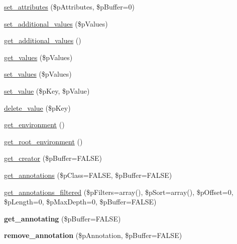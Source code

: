\begin{DoxyCompactItemize}
\item 
\hyperlink{classsteam__object_a348d67c78ca2754c3b03d640e9ea0594}{set\_\-attributes} (\$pAttributes, \$pBuffer=0)
\item 
\hyperlink{classsteam__object_a399fe34d68b8328e6380dcc891ef9aff}{set\_\-additional\_\-values} (\$pValues)
\item 
\hyperlink{classsteam__object_a5ad609e86be184a745d41318d6ae1a1e}{get\_\-additional\_\-values} ()
\item 
\hyperlink{classsteam__object_a4342f3d8ebca052a471df742eb052b20}{get\_\-values} (\$pValues)
\item 
\hyperlink{classsteam__object_a12e31dd22ff482a75f3bb423b8571b49}{set\_\-values} (\$pValues)
\item 
\hyperlink{classsteam__object_a5ebcd0c825cf2f5e7933a32fb91f49aa}{set\_\-value} (\$pKey, \$pValue)
\item 
\hyperlink{classsteam__object_a795b77fb1a75bfb564c0d95d060167c7}{delete\_\-value} (\$pKey)
\item 
\hyperlink{classsteam__object_ace4baf13ff7ad24a8aa260f9d551298b}{get\_\-environment} ()
\item 
\hyperlink{classsteam__object_a7bbd3642df6a4c789ee10e55e55d17c3}{get\_\-root\_\-environment} ()
\item 
\hyperlink{classsteam__object_ad79b59c522eb011ec389aef2e824942e}{get\_\-creator} (\$pBuffer=FALSE)
\item 
\hyperlink{classsteam__object_ab3b1b8e5f85069b51f14a81534fc7b4f}{get\_\-annotations} (\$pClass=FALSE, \$pBuffer=FALSE)
\item 
\hyperlink{classsteam__object_a9bbc1f5d4d5d69059da67d33d62c7b1a}{get\_\-annotations\_\-filtered} (\$pFilters=array(), \$pSort=array(), \$pOffset=0, \$pLength=0, \$pMaxDepth=0, \$pBuffer=FALSE)
\item 
\hypertarget{classsteam__object_ad9928db96be5b42bbe76da094aa4a486}{
{\bfseries get\_\-annotating} (\$pBuffer=FALSE)}
\label{classsteam__object_ad9928db96be5b42bbe76da094aa4a486}

\item 
\hypertarget{classsteam__object_a49d2b62a3ec0628fcfbc5ba922c15509}{
{\bfseries remove\_\-annotation} (\$pAnnotation, \$pBuffer=FALSE)}
\label{classsteam__object_a49d2b62a3ec0628fcfbc5ba922c15509}


\end{DoxyCompactItemize}
